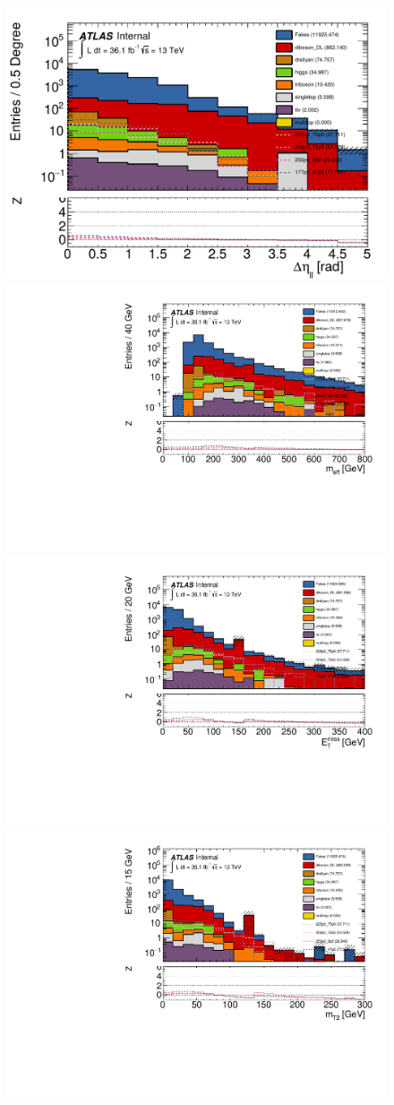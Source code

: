 \begin{figure}[htpb]
\centering
\includegraphics[width=0.45\linewidth]{data/plot/SR_redefinition/SRjet1_step0/leDeltaEtaLep_fakes.pdf}\includegraphics[width=0.45\linewidth]{data/plot/SR_redefinition/SRjet1_step0/lemeff_fakes.pdf}\\
\includegraphics[width=0.45\linewidth]{data/plot/SR_redefinition/SRjet1_step0/lemet_fakes.pdf}\includegraphics[width=0.45\linewidth]{data/plot/SR_redefinition/SRjet1_step0/lemt2ll_fakes.pdf}\\

\end{figure}
